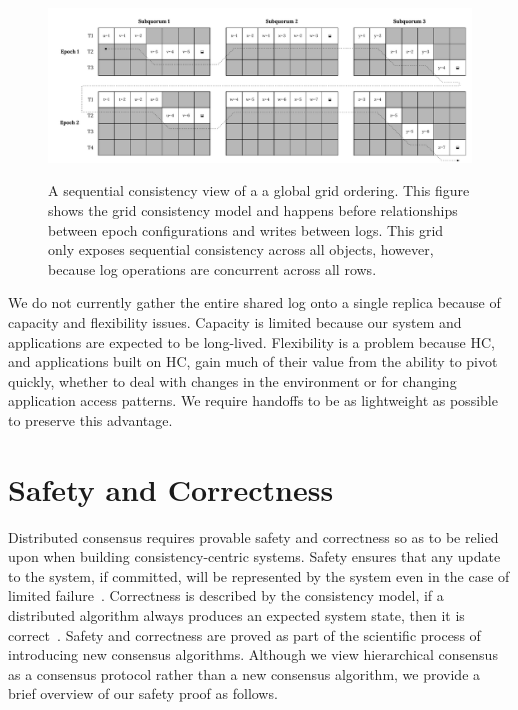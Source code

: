 \begin{landscape}
\begin{figure}
    \begin{center}
        \includegraphics[width=8.2in]{figures/ch03_log_ordering.pdf}
    \end{center}
    \renewcommand{\baselinestretch}{1}
    \small\normalsize

    \begin{quote}
        \caption[Grid Consistency: A Sequential Log Ordering]{A sequential consistency view of a a global grid ordering. This figure shows the grid consistency model and happens before relationships between epoch configurations and writes between logs. This grid only exposes sequential consistency across all objects, however, because log operations are concurrent across all rows.}
        \label{fig:ch03_log_ordering}
    \end{quote}
\end{figure}
\renewcommand{\baselinestretch}{2}
\small\normalsize
\end{landscape}

We do not currently gather the entire shared log onto a single replica because of capacity and flexibility issues.
Capacity is limited because our system and applications are expected to be long-lived.
Flexibility is a problem because HC, and applications built on HC, gain much of their value from the ability to pivot quickly, whether to deal with changes in the environment or for changing application access patterns.
We require handoffs to be as lightweight as possible to preserve this advantage.

\section{Safety and Correctness}
\label{ch03_safety}

Distributed consensus requires provable safety and correctness so as to be relied upon when building consistency-centric systems.
Safety ensures that any update to the system, if committed, will be represented by the system even in the case of limited failure~\cite{safety}.
Correctness is described by the consistency model, if a distributed algorithm always produces an expected system state, then it is correct~\cite{correctness}.
Safety and correctness are proved as part of the scientific process of introducing new consensus algorithms.
Although we view hierarchical consensus as a consensus protocol rather than a new consensus algorithm, we provide a brief overview of our safety proof as follows.

